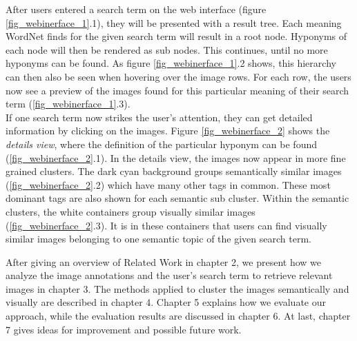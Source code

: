 After users entered a search term on the web interface (figure \ref{fig_webinerface_1}.1), they will be presented with a result tree.
Each meaning WordNet finds for the given search term will result in a root node.
Hyponyms  of each node will then be rendered as sub nodes.
This continues, until no more hyponyms can be found.
As figure \ref{fig_webinerface_1}.2 shows, this hierarchy can then also be seen when hovering over the image rows.
For each row, the users now see a preview of the images found for this particular meaning of their search term (\ref{fig_webinerface_1}.3). \\
If one search term now strikes the user's attention, they can get detailed information by clicking on the images.
Figure \ref{fig_webinerface_2} shows the \emph{details view}, where the definition of the particular hyponym can be found (\ref{fig_webinerface_2}.1).
In the details view, the images now appear in more fine grained clusters.
The dark cyan background groups semantically similar images (\ref{fig_webinerface_2}.2) which have many other tags in common. These most dominant tags are also shown for each semantic sub cluster.
Within the semantic clusters, the white containers group visually similar images (\ref{fig_webinerface_2}.3). It is in these containers that users can find visually similar images belonging to one semantic topic of the given search term.

\bigskip

After giving an overview of Related Work in chapter 2, we present how we analyze the image annotations and the user's search term to retrieve relevant images in chapter 3. The methods applied to cluster the images semantically and visually are described in chapter 4. Chapter 5 explains how we evaluate our approach, while the evaluation results are discussed in chapter 6. At last, chapter 7 gives ideas for improvement and possible future work.
